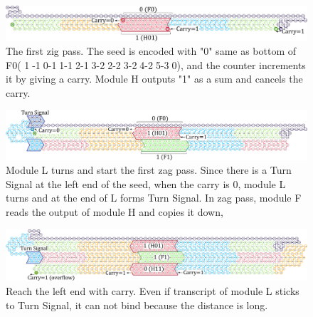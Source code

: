 \documentclass[runningheads]{llncs}
\begin{document}
\begin{figure}[tb]
\centering
\includegraphics[width=\linewidth]{fig/svg/CounterEx5_1.pdf}
\caption{
The first zig pass.
The seed is encoded with "0" same as bottom of F0(
\textcircled{\scriptsize 1}{-}\textcircled{\scriptsize 10}{-}\textcircled{\scriptsize 11}{-}\textcircled{\scriptsize 12}{-}\textcircled{\scriptsize 13}{-}\textcircled{\scriptsize 22}{-}\textcircled{\scriptsize 23}{-}\textcircled{\scriptsize 24}{-}\textcircled{\scriptsize 25}{-}\textcircled{\scriptsize 30}),
 and the counter increments it by giving a carry.
Module H outputs "1" as a sum and cancels the carry.
}
\label{fig:counter1stzig}
\end{figure}

\begin{figure}[tb]
\centering
\includegraphics[width=\linewidth]{fig/svg/CounterEx11_1.pdf}
\caption{
Module L turns and start the first zag pass.
Since there is a Turn Signal at the left end of the seed, when the carry is 0, module L turns and at the end of L forms Turn Signal.
In zag pass, module F reads the output of module H and copies it down,
}
\label{fig:counter1stzag}
\end{figure}

\begin{figure}[tb]
\centering
\includegraphics[width=\linewidth]{fig/svg/CounterEx13_1.pdf}
\caption{
Reach the left end with carry.
Even if transcript of module L sticks to Turn Signal, it can not bind because the distance is long.
}
\label{fig:overflowex1}
\end{figure}
\end{document}
